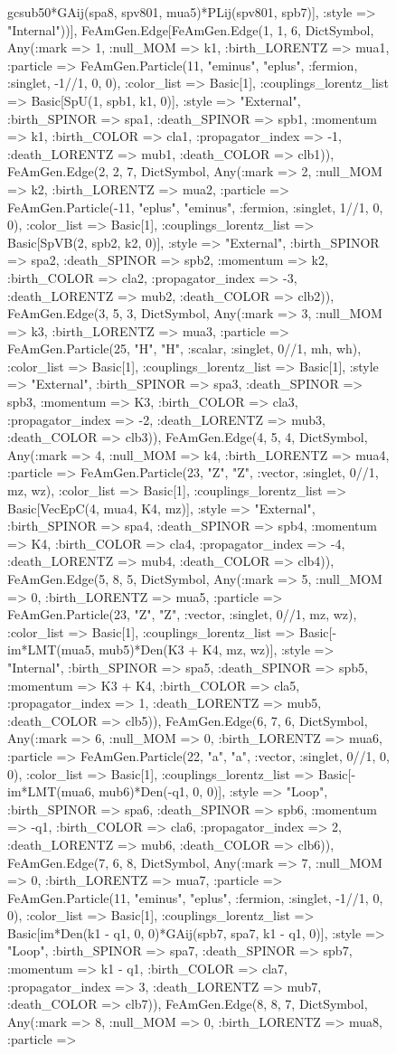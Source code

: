 \documentclass{revtex4}
\begin{document}
\begin{figure}[!htb]
\begin{center}
{gcsub50*GAij(spa8, spv801, mua5)*PLij(spv801, spb7)], :style => "Internal"))], FeAmGen.Edge[FeAmGen.Edge(1, 1, 6, Dict{Symbol, Any}(:mark => 1, :null_MOM => k1, :birth_LORENTZ => mua1, :particle => FeAmGen.Particle(11, "eminus", "eplus", :fermion, :singlet, -1//1, 0, 0), :color_list => Basic[1], :couplings_lorentz_list => Basic[SpU(1, spb1, k1, 0)], :style => "External", :birth_SPINOR => spa1, :death_SPINOR => spb1, :momentum => k1, :birth_COLOR => cla1, :propagator_index => -1, :death_LORENTZ => mub1, :death_COLOR => clb1)), FeAmGen.Edge(2, 2, 7, Dict{Symbol, Any}(:mark => 2, :null_MOM => k2, :birth_LORENTZ => mua2, :particle => FeAmGen.Particle(-11, "eplus", "eminus", :fermion, :singlet, 1//1, 0, 0), :color_list => Basic[1], :couplings_lorentz_list => Basic[SpVB(2, spb2, k2, 0)], :style => "External", :birth_SPINOR => spa2, :death_SPINOR => spb2, :momentum => k2, :birth_COLOR => cla2, :propagator_index => -3, :death_LORENTZ => mub2, :death_COLOR => clb2)), FeAmGen.Edge(3, 5, 3, Dict{Symbol, Any}(:mark => 3, :null_MOM => k3, :birth_LORENTZ => mua3, :particle => FeAmGen.Particle(25, "H", "H", :scalar, :singlet, 0//1, mh, wh), :color_list => Basic[1], :couplings_lorentz_list => Basic[1], :style => "External", :birth_SPINOR => spa3, :death_SPINOR => spb3, :momentum => K3, :birth_COLOR => cla3, :propagator_index => -2, :death_LORENTZ => mub3, :death_COLOR => clb3)), FeAmGen.Edge(4, 5, 4, Dict{Symbol, Any}(:mark => 4, :null_MOM => k4, :birth_LORENTZ => mua4, :particle => FeAmGen.Particle(23, "Z", "Z", :vector, :singlet, 0//1, mz, wz), :color_list => Basic[1], :couplings_lorentz_list => Basic[VecEpC(4, mua4, K4, mz)], :style => "External", :birth_SPINOR => spa4, :death_SPINOR => spb4, :momentum => K4, :birth_COLOR => cla4, :propagator_index => -4, :death_LORENTZ => mub4, :death_COLOR => clb4)), FeAmGen.Edge(5, 8, 5, Dict{Symbol, Any}(:mark => 5, :null_MOM => 0, :birth_LORENTZ => mua5, :particle => FeAmGen.Particle(23, "Z", "Z", :vector, :singlet, 0//1, mz, wz), :color_list => Basic[1], :couplings_lorentz_list => Basic[-im*LMT(mua5, mub5)*Den(K3 + K4, mz, wz)], :style => "Internal", :birth_SPINOR => spa5, :death_SPINOR => spb5, :momentum => K3 + K4, :birth_COLOR => cla5, :propagator_index => 1, :death_LORENTZ => mub5, :death_COLOR => clb5)), FeAmGen.Edge(6, 7, 6, Dict{Symbol, Any}(:mark => 6, :null_MOM => 0, :birth_LORENTZ => mua6, :particle => FeAmGen.Particle(22, "a", "a", :vector, :singlet, 0//1, 0, 0), :color_list => Basic[1], :couplings_lorentz_list => Basic[-im*LMT(mua6, mub6)*Den(-q1, 0, 0)], :style => "Loop", :birth_SPINOR => spa6, :death_SPINOR => spb6, :momentum => -q1, :birth_COLOR => cla6, :propagator_index => 2, :death_LORENTZ => mub6, :death_COLOR => clb6)), FeAmGen.Edge(7, 6, 8, Dict{Symbol, Any}(:mark => 7, :null_MOM => 0, :birth_LORENTZ => mua7, :particle => FeAmGen.Particle(11, "eminus", "eplus", :fermion, :singlet, -1//1, 0, 0), :color_list => Basic[1], :couplings_lorentz_list => Basic[im*Den(k1 - q1, 0, 0)*GAij(spb7, spa7, k1 - q1, 0)], :style => "Loop", :birth_SPINOR => spa7, :death_SPINOR => spb7, :momentum => k1 - q1, :birth_COLOR => cla7, :propagator_index => 3, :death_LORENTZ => mub7, :death_COLOR => clb7)), FeAmGen.Edge(8, 8, 7, Dict{Symbol, Any}(:mark => 8, :null_MOM => 0, :birth_LORENTZ => mua8, :particle => }
\end{center}
\end{figure}
\end{document}
